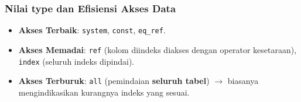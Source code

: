 \documentclass{article}
\begin{document}
\subsubsection{Nilai type dan Efisiensi Akses Data}
\begin{itemize}
    \item \textbf{Akses Terbaik}: \texttt{system}, \texttt{const}, \texttt{eq\_ref}.
    \item \textbf{Akses Memadai}: \texttt{ref} (kolom diindeks diakses dengan operator kesetaraan), \texttt{index} (seluruh indeks dipindai).
    \item \textbf{Akses Terburuk}: \texttt{all} (pemindaian \textbf{seluruh tabel}) $\rightarrow$ biasanya mengindikasikan kurangnya indeks yang sesuai.
\end{itemize}
\end{document}
